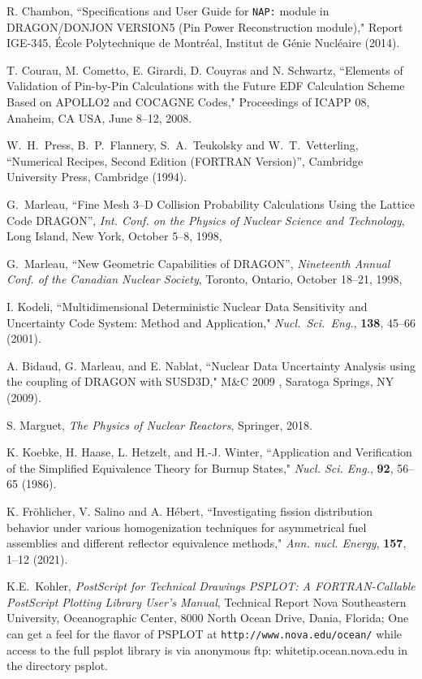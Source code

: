 \begin{thebibliography}{99}
R. Chambon, ``Specifications and User Guide for {\tt NAP:} module in DRAGON/DONJON VERSION5
(Pin Power Reconstruction module)," Report IGE-345,
\'Ecole Polytechnique de Montr\'eal,
 Institut de G\'enie Nucl\'eaire (2014).

T. Courau, M. Cometto, E. Girardi, D. Couyras and N. Schwartz, ``Elements of Validation of Pin-by-Pin Calculations with the Future EDF Calculation Scheme Based on APOLLO2 and COCAGNE Codes," Proceedings of ICAPP 08, Anaheim, CA USA, June 8--12, 2008.

W.~H.~Press, B.~P.~Flannery, S.~A.~Teukolsky and W.~T.~Vetterling, ``Numerical
Recipes, Second Edition (FORTRAN Version)'', Cambridge University Press,
Cambridge (1994).

G.~Marleau, 
``Fine Mesh 3--D Collision Probability Calculations Using the Lattice Code DRAGON'',
\textsl{Int. Conf. on the Physics of Nuclear Science and Technology}, 
Long Island, New York, October 5--8, 1998,

G.~Marleau, ``New Geometric Capabilities of DRAGON'',
\textsl{Nineteenth Annual Conf. of the Canadian Nuclear Society}, 
Toronto, Ontario, October 18--21, 1998,

I. Kodeli, ``Multidimensional Deterministic Nuclear Data Sensitivity and Uncertainty Code System: Method and Application,"
{\sl Nucl.~Sci.~Eng.}, {\bf 138}, 45--66 (2001).

A. Bidaud, G. Marleau, and E. Nablat, ``Nuclear Data Uncertainty Analysis using the coupling of DRAGON with SUSD3D," M\&C 2009 , Saratoga Springs, NY (2009).

S. Marguet, {\sl The Physics of Nuclear Reactors}, Springer, 2018.

K. Koebke, H. Haase, L. Hetzelt, and H.-J. Winter, ``Application and Verification of the Simplified Equivalence Theory
for Burnup States," {\sl Nucl. Sci. Eng.}, {\bf 92}, 56--65 (1986).

K. Fr\"{o}hlicher, V. Salino and A. H\'ebert, ``Investigating fission distribution behavior under various
homogenization techniques for asymmetrical fuel assemblies and different reflector equivalence methods,"
{\sl Ann. nucl. Energy}, {\bf 157}, 1--12 (2021).

K.E.~Kohler, 
\textsl{PostScript for Technical Drawings PSPLOT: A FORTRAN-Callable PostScript Plotting
Library User's Manual}, 
Technical Report Nova Southeastern University, Oceanographic
Center, 8000 North Ocean Drive, Dania, Florida; One can get a feel for the flavor of
PSPLOT at {\tt http://www.nova.edu/ocean/} while access to the full psplot library is via
anonymous ftp: whitetip.ocean.nova.edu in the directory psplot. 


\end{thebibliography}
